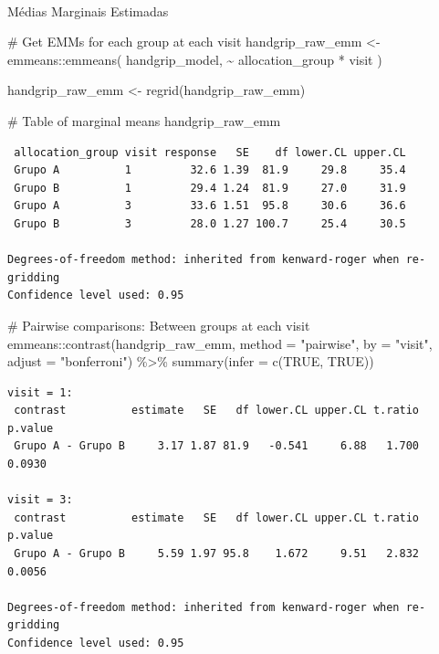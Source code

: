 \documentclass[
  letterpaper,
  DIV=11,
  numbers=noendperiod]{scrartcl}
\makeatletter
\let\oldparagraph\paragraph
\renewcommand{\paragraph}{
    \@ifstar
      \xxxParagraphStar
      \xxxParagraphNoStar
  }
\newcommand{\xxxParagraphStar}[1]{\oldparagraph*{#1}\mbox{}}
\newcommand{\xxxParagraphNoStar}[1]{\oldparagraph{#1}\mbox{}}
\newenvironment{Shaded}{\begin{snugshade}}{\end{snugshade}}
\newcommand{\AttributeTok}[1]{\textcolor[rgb]{0.40,0.45,0.13}{#1}}
\newcommand{\CommentTok}[1]{\textcolor[rgb]{0.37,0.37,0.37}{#1}}
\newcommand{\ConstantTok}[1]{\textcolor[rgb]{0.56,0.35,0.01}{#1}}
\newcommand{\FunctionTok}[1]{\textcolor[rgb]{0.28,0.35,0.67}{#1}}
\newcommand{\NormalTok}[1]{\textcolor[rgb]{0.00,0.23,0.31}{#1}}
\newcommand{\OtherTok}[1]{\textcolor[rgb]{0.00,0.23,0.31}{#1}}
\newcommand{\SpecialCharTok}[1]{\textcolor[rgb]{0.37,0.37,0.37}{#1}}
\newcommand{\StringTok}[1]{\textcolor[rgb]{0.13,0.47,0.30}{#1}}
\makeatother
\begin{document}
\paragraph{Médias Marginais
Estimadas}\label{muxe9dias-marginais-estimadas-20}

\begin{Shaded}
\begin{Highlighting}[]
\CommentTok{\# Get EMMs for each group at each visit}
\NormalTok{handgrip\_raw\_emm }\OtherTok{\textless{}{-}}\NormalTok{ emmeans}\SpecialCharTok{::}\FunctionTok{emmeans}\NormalTok{(}
\NormalTok{    handgrip\_model, }
    \SpecialCharTok{\textasciitilde{}}\NormalTok{ allocation\_group }\SpecialCharTok{*}\NormalTok{ visit}
\NormalTok{)}

\NormalTok{handgrip\_raw\_emm }\OtherTok{\textless{}{-}} \FunctionTok{regrid}\NormalTok{(handgrip\_raw\_emm)}

\CommentTok{\# Table of marginal means}
\NormalTok{handgrip\_raw\_emm}
\end{Highlighting}
\end{Shaded}

\begin{verbatim}
 allocation_group visit response   SE    df lower.CL upper.CL
 Grupo A          1         32.6 1.39  81.9     29.8     35.4
 Grupo B          1         29.4 1.24  81.9     27.0     31.9
 Grupo A          3         33.6 1.51  95.8     30.6     36.6
 Grupo B          3         28.0 1.27 100.7     25.4     30.5

Degrees-of-freedom method: inherited from kenward-roger when re-gridding 
Confidence level used: 0.95 
\end{verbatim}

\begin{Shaded}
\begin{Highlighting}[]
\CommentTok{\# Pairwise comparisons: Between groups at each visit}
\NormalTok{emmeans}\SpecialCharTok{::}\FunctionTok{contrast}\NormalTok{(handgrip\_raw\_emm, }\AttributeTok{method =} \StringTok{"pairwise"}\NormalTok{, }\AttributeTok{by =} \StringTok{"visit"}\NormalTok{, }\AttributeTok{adjust =} \StringTok{"bonferroni"}\NormalTok{) }\SpecialCharTok{\%\textgreater{}\%} \FunctionTok{summary}\NormalTok{(}\AttributeTok{infer =} \FunctionTok{c}\NormalTok{(}\ConstantTok{TRUE}\NormalTok{, }\ConstantTok{TRUE}\NormalTok{))}
\end{Highlighting}
\end{Shaded}

\begin{verbatim}
visit = 1:
 contrast          estimate   SE   df lower.CL upper.CL t.ratio p.value
 Grupo A - Grupo B     3.17 1.87 81.9   -0.541     6.88   1.700  0.0930

visit = 3:
 contrast          estimate   SE   df lower.CL upper.CL t.ratio p.value
 Grupo A - Grupo B     5.59 1.97 95.8    1.672     9.51   2.832  0.0056

Degrees-of-freedom method: inherited from kenward-roger when re-gridding 
Confidence level used: 0.95 
\end{verbatim}
\end{document}
